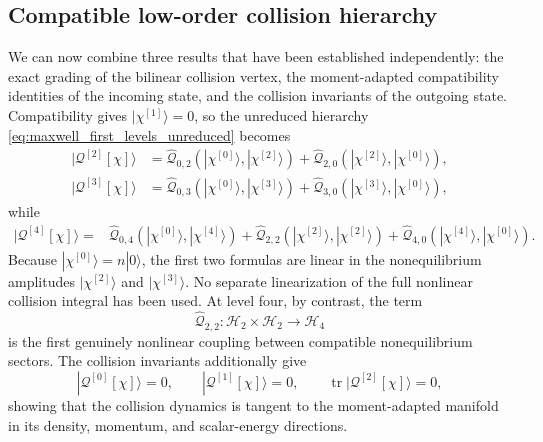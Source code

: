 \documentclass[11pt,oneside]{article}
\numberwithin{equation}{section}
\theoremstyle{definition}
\begin{document}
\subsection{Compatible low-order collision hierarchy}
\label{subsec:maxwell_compatible_low_order}

We can now combine three results that have been established independently: the exact grading of the bilinear collision vertex, the moment-adapted compatibility identities of the incoming state, and the collision invariants of the outgoing state.  Compatibility gives $|\chi^{[1]}\rangle=0$, so the unreduced hierarchy \eqref{eq:maxwell_first_levels_unreduced} becomes
\begin{align}
|\mathcal Q^{[2]}[\chi]\rangle
&=
\widehat{\mathcal Q}_{0,2}(|\chi^{[0]}\rangle,|\chi^{[2]}\rangle)
+
\widehat{\mathcal Q}_{2,0}(|\chi^{[2]}\rangle,|\chi^{[0]}\rangle),
\label{eq:maxwell_Q2_compatible_structural}
\\
|\mathcal Q^{[3]}[\chi]\rangle
&=
\widehat{\mathcal Q}_{0,3}(|\chi^{[0]}\rangle,|\chi^{[3]}\rangle)
+
\widehat{\mathcal Q}_{3,0}(|\chi^{[3]}\rangle,|\chi^{[0]}\rangle),
\label{eq:maxwell_Q3_compatible_structural}
\end{align}
while
\begin{align}
|\mathcal Q^{[4]}[\chi]\rangle
={}&
\widehat{\mathcal Q}_{0,4}(|\chi^{[0]}\rangle,|\chi^{[4]}\rangle)
+
\widehat{\mathcal Q}_{2,2}(|\chi^{[2]}\rangle,|\chi^{[2]}\rangle)
+
\widehat{\mathcal Q}_{4,0}(|\chi^{[4]}\rangle,|\chi^{[0]}\rangle).
\label{eq:maxwell_Q4_compatible_structural}
\end{align}
Because $|\chi^{[0]}\rangle=n|0\rangle$, the first two formulas are linear in the nonequilibrium amplitudes $|\chi^{[2]}\rangle$ and $|\chi^{[3]}\rangle$.  No separate linearization of the full nonlinear collision integral has been used.  At level four, by contrast, the term
\begin{equation}
\widehat{\mathcal Q}_{2,2}:
\mathscr H_2\times\mathscr H_2
\longrightarrow
\mathscr H_4
\label{eq:maxwell_first_nonlinear_vertex}
\end{equation}
is the first genuinely nonlinear coupling between compatible nonequilibrium sectors.  The collision invariants additionally give
\begin{equation}
 |\mathcal Q^{[0]}[\chi]\rangle=0,
 \qquad
 |\mathcal Q^{[1]}[\chi]\rangle=0,
 \qquad
 \operatorname{tr}|\mathcal Q^{[2]}[\chi]\rangle=0,
\end{equation}
showing that the collision dynamics is tangent to the moment-adapted manifold in its density, momentum, and scalar-energy directions.
\end{document}
